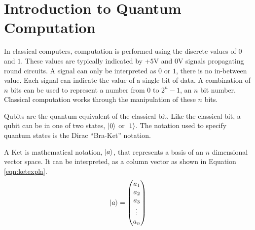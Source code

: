 \section{Introduction to Quantum Computation}
In classical computers, computation is performed using the discrete values of $0$ and $1$.
These values are typically indicated by +$5$V and $0$V signals propagating round circuits.
A signal can only be interpreted as $0$ or $1$, there is no in-between value.
Each signal can indicate the value of a single bit of data.
A combination of $n$ bits can be used to represent a number from $0$ to $2^n-1$, an $n$ bit number.
Classical computation works through the manipulation of these $n$ bits.

Qubits are the quantum equivalent of the classical bit.
Like the classical bit, a qubit can be in one of two states, $\left\vert{0}\right\rangle$ or $\left\vert{1}\right\rangle$.
The notation used to specify quantum states is the Dirac\cite{dirac2004principles} ``Bra-Ket'' notation.

A Ket is mathematical notation, $\left\vert{a}\right\rangle$, that represents a basis of an $n$ dimensional vector space.
It can be interpreted, as a column vector as shown in Equation \ref{eqn:ketexpla}.
\begin{equation}
\left\vert{a}\right\rangle = 
\begin{pmatrix}
a_1\\
a_2\\
a_3\\
\vdots \\
a_n
\end{pmatrix}
\label{eqn:ketexpla}
\end{equation}

